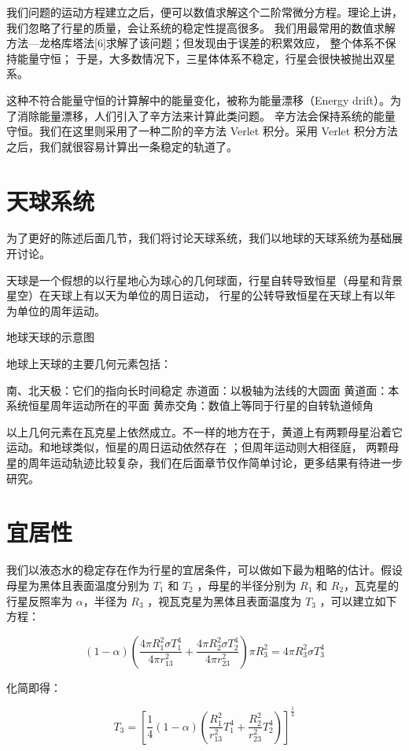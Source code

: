 \documentclass[a4paper,10.5pt]{book}
\begin{document}
我们问题的运动方程建立之后，便可以数值求解这个二阶常微分方程。理论上讲，我们忽略了行星的质量，会让系统的稳定性提高很多。
我们用最常用的数值求解方法—龙格库塔法[6]求解了该问题；但发现由于误差的积累效应， 整个体系不保持能量守恒；
于是，大多数情况下，三星体体系不稳定，行星会很快被抛出双星系。

这种不符合能量守恒的计算解中的能量变化，被称为能量漂移（Energy drift）。为了消除能量漂移，人们引入了辛方法来计算此类问题。
辛方法会保持系统的能量守恒。我们在这里则采用了一种二阶的辛方法 Verlet 积分。采用 Verlet 积分方法之后，我们就很容易计算出一条稳定的轨道了。

\section{天球系统}

为了更好的陈述后面几节，我们将讨论天球系统，我们以地球的天球系统为基础展开讨论。

天球是一个假想的以行星地心为球心的几何球面，行星自转导致恒星（母星和背景星空）在天球上有以天为单位的周日运动，
行星的公转导致恒星在天球上有以年为单位的周年运动。

地球天球的示意图

地球上天球的主要几何元素包括：

南、北天极：它们的指向长时间稳定
赤道面：以极轴为法线的大圆面
黄道面：本系统恒星周年运动所在的平面
黄赤交角：数值上等同于行星的自转轨道倾角

以上几何元素在瓦克星上依然成立。不一样的地方在于，黄道上有两颗母星沿着它运动。和地球类似，恒星的周日运动依然存在 ；但周年运动则大相径庭，
两颗母星的周年运动轨迹比较复杂，我们在后面章节仅作简单讨论，更多结果有待进一步研究。

\section{宜居性}

我们以液态水的稳定存在作为行星的宜居条件，可以做如下最为粗略的估计。假设母星为黑体且表面温度分别为 $T_1$ 和 $T_2$ ，母星的半径分别为 $R_1$ 和 $R_2$，瓦克星的行星反照率为 $\alpha$，半径为 $R_3$ ，视瓦克星为黑体且表面温度为 $T_3$  ，可以建立如下方程：

$$\left ( 1 - \alpha \right ) \left(  \frac{4 \pi R_1^2 \sigma T_1^4} {4 \pi r_{13}^2} + \frac{4 \pi R_2^2 \sigma T_2^4} {4 \pi r_{23}^2} \right ) \pi R_3^2= 4 \pi R_3^2 \sigma T_3^4$$

化简即得：

$$T_3 = \left[ \frac{1}{4} \left( 1 - \alpha \right ) \left( \frac{R_1^2}{r_{13}^2} T_1^4 + \frac{R_2^2}{r_{23}^2} T_2^4 \right ) \right ]^{\frac{1}{4}}$$
\end{document}
